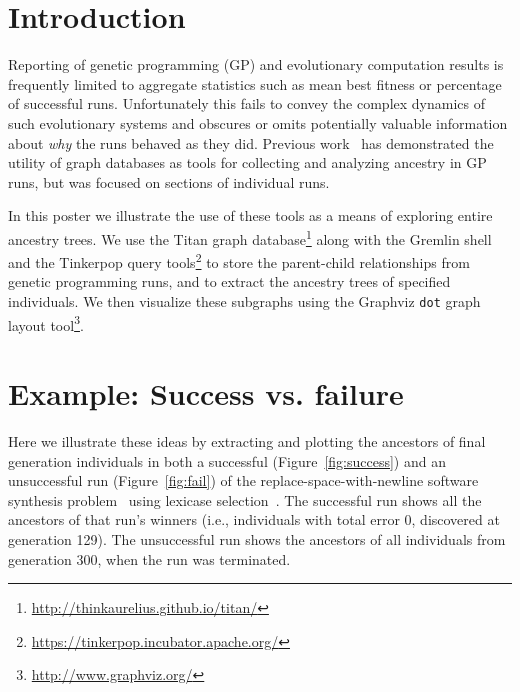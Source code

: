 \documentclass{sig-alternate}
\begin{document}

\printccsdesc


\section{Introduction}
\label{sec:introduction}

Reporting of genetic programming (GP) and evolutionary computation results is frequently limited to aggregate statistics such as mean best fitness or percentage of successful runs. Unfortunately this fails to convey the complex dynamics of such evolutionary systems and obscures or omits potentially valuable information about \emph{why} the runs behaved as they did. Previous work~\cite{McPhee:2015:GPTP} has demonstrated the utility of graph databases as tools for collecting and analyzing ancestry in GP runs, but was focused on sections of individual runs.

In this poster we illustrate the use of these tools as a means of exploring entire ancestry trees. We use the Titan graph database\footnote{\url{http://thinkaurelius.github.io/titan/}} along with the Gremlin shell and the Tinkerpop query tools\footnote{\url{https://tinkerpop.incubator.apache.org/}} to store the parent-child relationships from genetic programming runs, and to extract the ancestry trees of specified individuals. We then visualize these subgraphs using the Graphviz \texttt{dot} graph layout tool\footnote{\url{http://www.graphviz.org/}}.

\section{Example: Success vs. failure}
\label{sec:examples}

Here we illustrate these ideas by extracting and plotting the ancestors of final generation individuals in both a successful (Figure~\ref{fig:success}) and an unsuccessful run (Figure~\ref{fig:fail}) of the replace-space-with-newline software synthesis problem~\cite{Helmuth:2015:GECCO,Helmuth:2015:dissertation} using lexicase selection~\cite{Helmuth:2014:ieeeTEC}. The successful run shows all the ancestors of that run's winners (i.e., individuals with total error 0, discovered at generation 129). The unsuccessful run shows the ancestors of all individuals from generation 300, when the run was terminated.
\end{document}
